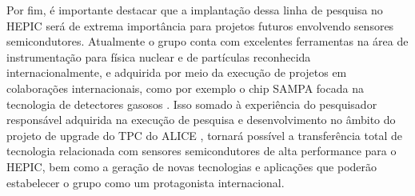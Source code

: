 
Por fim, é importante destacar que a implantação dessa linha de pesquisa no HEPIC será de extrema importância para projetos futuros envolvendo sensores semicondutores. Atualmente o grupo conta com excelentes ferramentas na área de instrumentação para física nuclear e de partículas reconhecida internacionalmente, e adquirida por meio da execução de projetos em colaborações internacionais, como por exemplo o chip SAMPA focada na tecnologia de detectores gasosos \cite{ref1}. Isso somado à experiência do pesquisador responsável adquirida na execução de pesquisa e desenvolvimento no âmbito do projeto de upgrade do TPC do ALICE \cite{tpcNIM,discharge_paper}, tornará possível a transferência total de tecnologia relacionada com sensores semicondutores de alta performance para o HEPIC, bem como a geração de novas tecnologias e aplicações que poderão estabelecer o grupo como um protagonista internacional.

\renewcommand{\cleardoublepage}{}
\renewcommand{\clearpage}{}